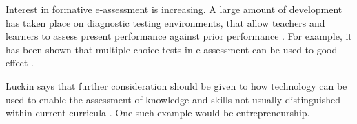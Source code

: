     Interest in formative e-assessment is increasing. A large amount of development has taken place on diagnostic testing environments, that allow teachers and learners to assess present performance against prior performance \citep{luckin}. For example, it has been shown that multiple-choice tests in e-assessment can be used to good effect \citep{nicol}.


    Luckin says that further consideration should  be given to how technology can be used to enable the assessment of knowledge and skills not usually distinguished within current curricula \citep{luckin}. One such example would be entrepreneurship.

    
